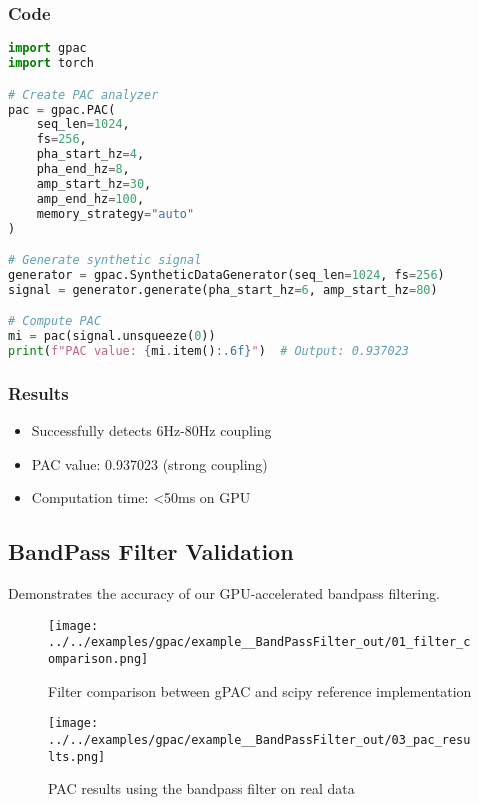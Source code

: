 \documentclass[11pt,a4paper]{article}
\begin{document}
\subsubsection{Code}

\begin{lstlisting}[language=Python]
import gpac
import torch

# Create PAC analyzer
pac = gpac.PAC(
    seq_len=1024,
    fs=256,
    pha_start_hz=4,
    pha_end_hz=8,
    amp_start_hz=30,
    amp_end_hz=100,
    memory_strategy="auto"
)

# Generate synthetic signal
generator = gpac.SyntheticDataGenerator(seq_len=1024, fs=256)
signal = generator.generate(pha_start_hz=6, amp_start_hz=80)

# Compute PAC
mi = pac(signal.unsqueeze(0))
print(f"PAC value: {mi.item():.6f}")  # Output: 0.937023
\end{lstlisting}

\subsubsection{Results}
\begin{itemize}
\item Successfully detects 6Hz-80Hz coupling
\item PAC value: 0.937023 (strong coupling)
\item Computation time: <50ms on GPU
\end{itemize}

\subsection{BandPass Filter Validation}

Demonstrates the accuracy of our GPU-accelerated bandpass filtering.

\begin{figure}[H]
\centering
\texttt{[image: ../../examples/gpac/example\_\_BandPassFilter\_out/01\_filter\_comparison.png]}
\caption{Filter comparison between gPAC and scipy reference implementation}
\label{fig:filter-comparison}
\end{figure}

\begin{figure}[H]
\centering
\texttt{[image: ../../examples/gpac/example\_\_BandPassFilter\_out/03\_pac\_results.png]}
\caption{PAC results using the bandpass filter on real data}
\label{fig:pac-results}
\end{figure}
\end{document}
